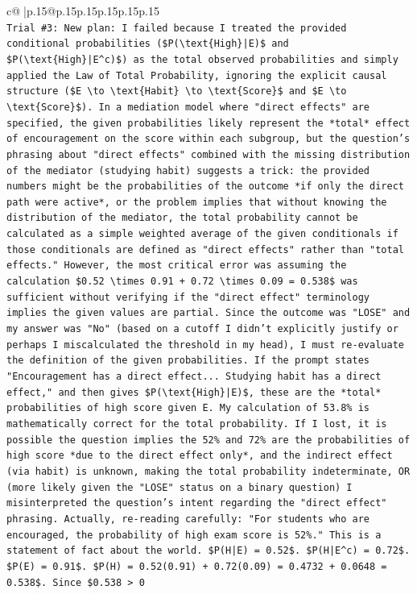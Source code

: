\documentclass{article}
\begin{document}
{\begin{supertabular}{c@{$\;$}|p{.15\linewidth}@{}p{.15\linewidth}p{.15\linewidth}p{.15\linewidth}p{.15\linewidth}p{.15\linewidth}}
{{{\\ 
\texttt{Trial \#3: New plan: I failed because I treated the provided conditional probabilities (\$P(\textbackslash{}text\{High\}|E)\$ and \$P(\textbackslash{}text\{High\}|E\^{}c)\$) as the total observed probabilities and simply applied the Law of Total Probability, ignoring the explicit causal structure (\$E \textbackslash{}to \textbackslash{}text\{Habit\} \textbackslash{}to \textbackslash{}text\{Score\}\$ and \$E \textbackslash{}to \textbackslash{}text\{Score\}\$). In a mediation model where "direct effects" are specified, the given probabilities likely represent the *total* effect of encouragement on the score within each subgroup, but the question's phrasing about "direct effects" combined with the missing distribution of the mediator (studying habit) suggests a trick: the provided numbers might be the probabilities of the outcome *if only the direct path were active*, or the problem implies that without knowing the distribution of the mediator, the total probability cannot be calculated as a simple weighted average of the given conditionals if those conditionals are defined as "direct effects" rather than "total effects." However, the most critical error was assuming the calculation \$0.52 \textbackslash{}times 0.91 + 0.72 \textbackslash{}times 0.09 = 0.538\$ was sufficient without verifying if the "direct effect" terminology implies the given values are partial. Since the outcome was "LOSE" and my answer was "No" (based on a cutoff I didn't explicitly justify or perhaps I miscalculated the threshold in my head), I must re{-}evaluate the definition of the given probabilities. If the prompt states "Encouragement has a direct effect... Studying habit has a direct effect," and then gives \$P(\textbackslash{}text\{High\}|E)\$, these are the *total* probabilities of high score given E. My calculation of 53.8\% is mathematically correct for the total probability. If I lost, it is possible the question implies the 52\% and 72\% are the probabilities of high score *due to the direct effect only*, and the indirect effect (via habit) is unknown, making the total probability indeterminate, OR (more likely given the "LOSE" status on a binary question) I misinterpreted the question's intent regarding the "direct effect" phrasing. Actually, re{-}reading carefully: "For students who are encouraged, the probability of high exam score is 52\%." This is a statement of fact about the world. \$P(H|E) = 0.52\$. \$P(H|E\^{}c) = 0.72\$. \$P(E) = 0.91\$. \$P(H) = 0.52(0.91) + 0.72(0.09) = 0.4732 + 0.0648 = 0.538\$. Since \$0.538 > 0} \\
}}}
\end{supertabular}}
\end{document}
